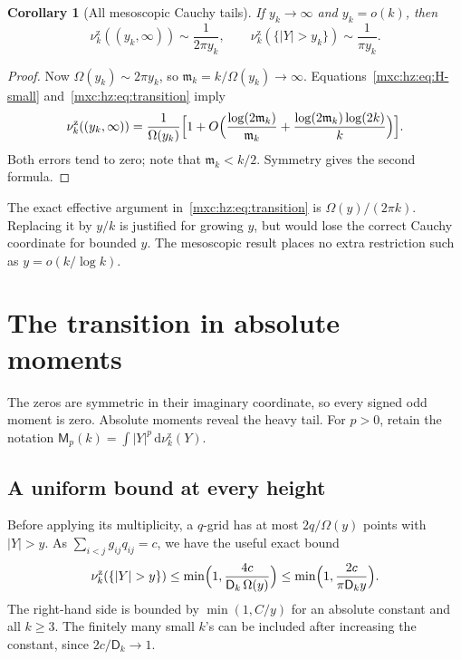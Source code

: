 \documentclass[11pt]{article}
\numberwithin{equation}{section}
\newtheorem{corollary}[theorem]{Corollary}
\theoremstyle{definition}
\theoremstyle{remark}
\newcommand{\dd}{\,\mathrm d}
\newcommand{\hznu}{\nu^{\mathrm z}}
\begin{document}
\begin{corollary}[All mesoscopic Cauchy tails]\label{mxc:hz:cor:mesoscopic}
If $y_k\to\infty$ and $y_k=o(k)$, then
\[
 \hznu_k((y_k,\infty))\sim\frac1{2\pi y_k},\qquad
 \hznu_k(\{|Y|>y_k\})\sim\frac1{\pi y_k}.
\]
\end{corollary}

\begin{proof}
Now $\Omega(y_k)\sim2\pi y_k$, so $\mathfrak m_k=k/\Omega(y_k)\to\infty$.
Equations~\eqref{mxc:hz:eq:H-small} and~\eqref{mxc:hz:eq:transition} imply
\[
 \hznu_k((y_k,\infty))
 =\frac1{\Omega(y_k)}
  \Bigl[1+O\Bigl(
  \frac{\log(2\mathfrak m_k)}{\mathfrak m_k}
  +\frac{\log(2\mathfrak m_k)\log(2k)}{k}\Bigr)\Bigr].
\]
Both errors tend to zero; note that $\mathfrak m_k<k/2$. Symmetry gives the
second formula.
\end{proof}

The exact effective argument in~\eqref{mxc:hz:eq:transition} is
$\Omega(y)/(2\pi k)$. Replacing it by $y/k$ is justified for growing $y$,
but would lose the correct Cauchy coordinate for bounded $y$. The
mesoscopic result places no extra restriction such as $y=o(k/\log k)$.

\section{The transition in absolute moments}\label{mxc:hz:sec:moments}

The zeros are symmetric in their imaginary coordinate, so every signed odd
moment is zero. Absolute moments reveal the heavy tail. For $p>0$, retain
the notation $\mathsf M_p(k)=\int|Y|^p\dd\hznu_k(Y)$.

\subsection{A uniform bound at every height}

Before applying its multiplicity, a $q$-grid has at most $2q/\Omega(y)$
points with $|Y|>y$. As $\sum_{i<j}g_{ij}q_{ij}=c$, we have the useful
exact bound
\begin{equation}\label{mxc:hz:eq:global-tail-bound}
 \hznu_k(\{|Y|>y\})
 \le\min\Bigl(1,\frac{4c}{\mathsf D_k\,\Omega(y)}\Bigr)
 \le\min\Bigl(1,\frac{2c}{\pi\mathsf D_ky}\Bigr).
\end{equation}
The right-hand side is bounded by $\min(1,C/y)$ for an absolute constant
and all $k\ge3$. The finitely many small $k$'s can be included after
increasing the constant, since $2c/\mathsf D_k\to1$.
\end{document}
